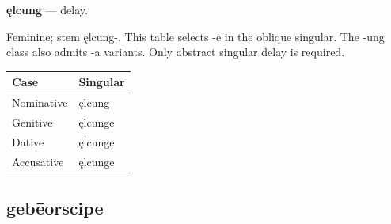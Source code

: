 \par\begin{minipage}{\linewidth}\raggedright
\textbf{ęlcung} — delay.

Feminine; stem ęlcung-. This table selects -e in the oblique singular. The -ung class also admits -a variants. Only abstract singular delay is required.

\par\begingroup
\fontsize{10.5}{13.2}\selectfont
\setlength{\LTleft}{0pt}\setlength{\LTright}{\fill}
\noindent
\begin{tabular}{@{}>{\raggedright\arraybackslash}p{60.59mm}>{\raggedright\arraybackslash}p{60.59mm}@{}}
\toprule
\textbf{Case} & \textbf{Singular} \\
\midrule
Nominative & ęlcung \\
Genitive & ęlcunge \\
Dative & ęlcunge \\
Accusative & ęlcunge \\
\bottomrule
\end{tabular}
\par\endgroup

\end{minipage}\par
{}
\subsection*{gebēorscipe}

